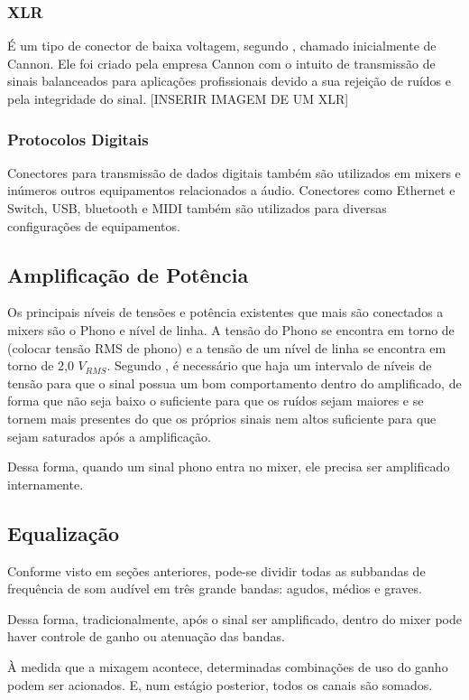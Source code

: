 \subsubsection{XLR}
É um tipo de conector de baixa voltagem, segundo \cite{bartlett}, chamado inicialmente de Cannon. Ele foi criado pela empresa Cannon com o intuito de transmissão de sinais balanceados para aplicações profissionais devido a sua rejeição de ruídos e pela integridade do sinal.
[INSERIR IMAGEM DE UM XLR]

\subsubsection{Protocolos Digitais}

Conectores para transmissão de dados digitais também são utilizados em mixers e inúmeros outros equipamentos relacionados a áudio. Conectores como Ethernet e Switch, USB, bluetooth e MIDI também são utilizados para diversas configurações de equipamentos.
  
\subsection{Amplificação de Potência}

Os principais níveis de tensões e potência existentes que mais são conectados a mixers são o Phono e nível de linha. A tensão do Phono se encontra em torno de (colocar tensão RMS de phono) e a tensão de um nível de linha se encontra em torno de 2,0 $V_{RMS}$. Segundo \cite{self2013audio}, é necessário que haja um intervalo de níveis de tensão para que o sinal possua um bom comportamento dentro do amplificado, de forma que não seja baixo o suficiente para que os ruídos sejam maiores e se tornem mais presentes do que os próprios sinais nem altos suficiente para que sejam saturados após a amplificação. 
\par
Dessa forma, quando um sinal phono entra no mixer, ele precisa ser amplificado internamente.

\subsection{Equalização}

Conforme visto em seções anteriores, pode-se dividir todas as subbandas de frequência de som audível em três grande bandas: agudos, médios e graves. 
\par
Dessa forma, tradicionalmente, após o sinal ser amplificado, dentro do mixer pode haver controle de ganho ou atenuação das bandas.
\par
À medida que a mixagem acontece, determinadas combinações de uso do ganho podem ser acionados. E, num estágio posterior, todos os canais são somados.

